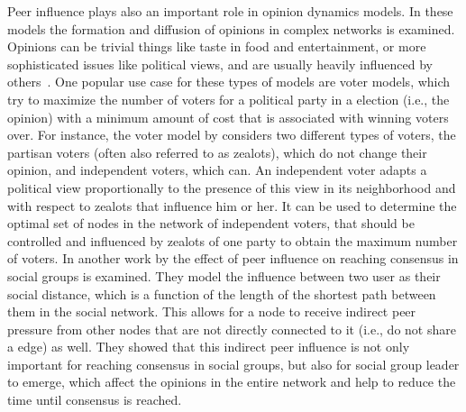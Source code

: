 Peer influence plays also an important role in opinion dynamics models.
In these models the formation and diffusion of opinions in complex networks is examined.
Opinions can be trivial things like taste in food and entertainment, or more sophisticated issues like political views, and are usually heavily influenced by others~\cite{Acemoglu2011}.
One popular use case for these types of models are voter models, which try to maximize the number of voters for a political party in a election (i.e., the opinion) with a minimum amount of cost that is associated with winning voters over.
For instance, the voter model by \citet{Masuda2015} considers two different types of voters, the partisan voters (often also referred to as zealots), which do not change their opinion, and independent voters, which can.
An independent voter adapts a political view proportionally to the presence of this view in its neighborhood and with respect to zealots that influence him or her.
It can be used to determine the optimal set of nodes in the network of independent voters, that should be controlled and influenced by zealots of one party to obtain the maximum number of voters.
In another work by \citet{Estrada2013} the effect of peer influence on reaching consensus in social groups is examined.
They model the influence between two user as their social distance, which is a function of the length of the shortest path between them in the social network.
This allows for a node to receive indirect peer pressure from other nodes that are not directly connected to it (i.e., do not share a edge) as well.
They showed that this indirect peer influence is not only important for reaching consensus in social groups, but also for social group leader to emerge, which affect the opinions in the entire network and help to reduce the time until consensus is reached.

